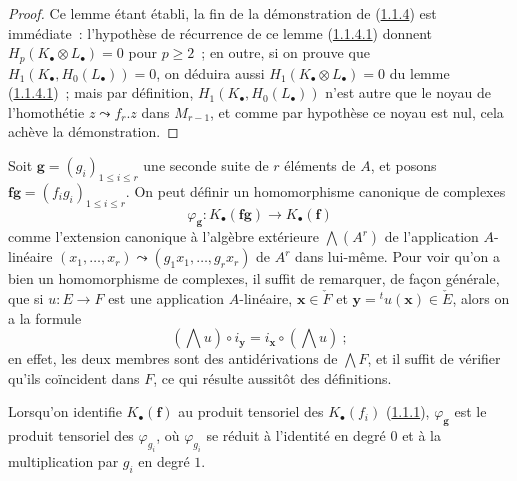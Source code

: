\begin{proof}
Ce lemme étant établi, la fin de la démonstration de
(\hyperref[III.1.1.4-fr]{1.1.4}) est immédiate~: l'hypothèse de récurrence de
ce lemme (\hyperref[III.1.1.4.1-fr]{1.1.4.1}) donnent
$H_p(K_\bullet\otimes L_\bullet)=0$ pour $p\geq2$~; en outre, si on prouve que
$H_1(K_\bullet,H_0(L_\bullet))=0$, on déduira aussi
$H_1(K_\bullet\otimes L_\bullet)=0$ du lemme
(\hyperref[III.1.1.4.1-fr]{1.1.4.1})~; mais par définition,
$H_1(K_\bullet,H_0(L_\bullet))$ n'est autre que le noyau de l'homothétie
$z\leadsto f_r.z$ dans $M_{r-1}$, et comme par hypothèse ce noyau est nul, cela
achève la démonstration.
\end{proof}

\begin{env}[1.1.5]
\label{III.1.1.5-fr}
Soit $\mathbf g=(g_i)_{1\leq i\leq r}$ une seconde suite de $r$ éléments de
$A$, et posons $\mathbf f\mathbf g=(f_ig_i)_{1\leq i\leq r}$. On peut définir
un homomorphisme canonique de complexes
\begin{equation}
\label{III.1.1.5.1-fr}
\tag{1.1.5.1}
\varphi_{\mathbf g}:K_\bullet(\mathbf f\mathbf g)\longrightarrow
K_\bullet(\mathbf f)
\end{equation}
comme l'extension canonique à l'algèbre extérieure $\bigwedge(A^r)$ de
l'application $A$-linéaire
$(x_1,\ldots,x_r)\leadsto(g_1x_1,\ldots,g_rx_r)$ de $A^r$ dans lui-même. Pour
voir qu'on a bien un homomorphisme de complexes, il suffit de remarquer, de
façon générale, que si $u:E\to F$ est une application $A$-linéaire,
$\mathbf x\in\check F$ et $\mathbf y={}^tu(\mathbf x)\in\check E$, alors on a
la formule
\begin{equation}
\label{III.1.1.5.2-fr}
\tag{1.1.5.2}
(\bigwedge u)\circ i_{\mathbf y}=i_{\mathbf x}\circ(\bigwedge u)~;
\end{equation}
en effet, les deux membres sont des antidérivations de $\bigwedge F$, et il
suffit de vérifier qu'ils coïncident dans $F$, ce qui résulte aussitôt des
définitions.

Lorsqu'on identifie $K_\bullet(\mathbf f)$ au produit tensoriel des
$K_\bullet(f_i)$ (\hyperref[III.1.1.1-fr]{1.1.1}), $\varphi_{\mathbf g}$ est
le produit tensoriel des $\varphi_{g_i}$, où $\varphi_{g_i}$ se réduit à
l'identité en degré $0$ et à la multiplication par $g_i$ en degré $1$.
\end{env}


